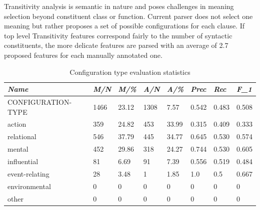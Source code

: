 Transitivity analysis is semantic in nature and poses challenges in meaning selection beyond constituent class or function. Current parser does not select one meaning but rather proposes a set of possible configurations for each clause. If top level Transitivity features correspond fairly to the number of syntactic constituents, the more delicate features are parsed with an average of 2.7 proposed features for each manually annotated one.

\begin{table}[H]
    \centering
    \begin{tabulary}{\linewidth}{|L|l|l|l|l|l|l|l|}
        \hline
        \textit{Name} & \textit{M/N} & \textit{M/\%} & \textit{A/N} & \textit{A/\%} & \textit{Prec} & \textit{Rec} & \textit{F_{1}} \\ \hline
        \rule[-2ex]{0pt}{5.5ex} CONFIGURATION-TYPE
        & 1466
        & 23.12
        & 1308
        & 7.57 & 0.542
        & 0.483
        & 0.508
        \\ 
        \hline \rule[-2ex]{0pt}{5.5ex} action
        & 359
        & 24.82
        & 453
        & 33.99
        & 0.315
        & 0.409
        & 0.333
        \\ 
        \hline \rule[-2ex]{0pt}{5.5ex} relational
        & 546
        & 37.79
        & 445
        & 34.77
        & 0.645
        & 0.530
        & 0.574
        \\ 
        \hline \rule[-2ex]{0pt}{5.5ex} mental
        & 452
        & 29.86
        & 318
        & 24.27
        & 0.744
        & 0.530
        & 0.605
        \\ 
        \hline \rule[-2ex]{0pt}{5.5ex} influential
        & 81
        & 6.69
        & 91
        & 7.39
        & 0.556
        & 0.519
        & 0.484
        \\ 
        \hline \rule[-2ex]{0pt}{5.5ex} event-relating
        & 28
        & 3.48
        & 1
        & 1.85
        & 1.0 & 0.5 & 0.667
        \\ 
        \hline \rule[-2ex]{0pt}{5.5ex} environmental
        & 0 & 0 & 0 & 0 & 0 & 0 & 0 \\ 
        \hline \rule[-2ex]{0pt}{5.5ex} other & 0 & 0 & 0 & 0 & 0 & 0 & 0 \\ 
        \hline 
    \end{tabulary}
    \caption{Configuration type evaluation statistics}
    \label{tab:configuration-statistics}
\end{table}

